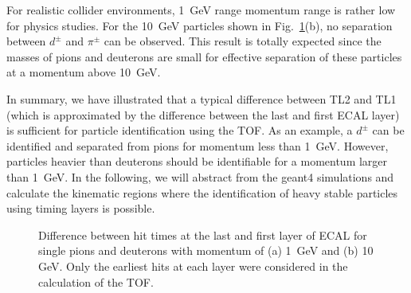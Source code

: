 \documentclass[final,1p,11pt]{elsarticle}
\begin{document}
For realistic collider environments, 1~GeV range momentum range is rather low
for physics studies. For the 10~GeV particles shown in Fig.~\ref{fig:timediff}(b), 
no separation between $d^{\pm}$ and $\pi^{\pm}$ can be observed.
This result is totally expected since the masses of pions and deuterons are small
for effective separation of these particles at a momentum above 10~GeV. 


In summary, we have illustrated that a typical difference between TL2 and TL1 (which is approximated by the difference
between the last and first ECAL layer) is sufficient for particle identification using the TOF.
As an example, a $d^{\pm}$ can be identified and separated from pions for momentum less than 1~GeV.
However, particles heavier than deuterons should be identifiable for a momentum larger than 1~GeV.
In the following, we will abstract from the {\sc geant}4 simulations and calculate the kinematic regions  where the 
 identification of heavy stable  particles using timing layers is possible.
 

\begin{figure}
\begin{center}
\end{center}
\caption{Difference between hit times at the last and first layer of ECAL for single pions and deuterons  with 
 momentum of (a) 1~GeV  and (b) 10 GeV. Only the earliest hits at each layer were considered in the  calculation of the TOF. }
\label{fig:timediff}
\end{figure}
\end{document}
